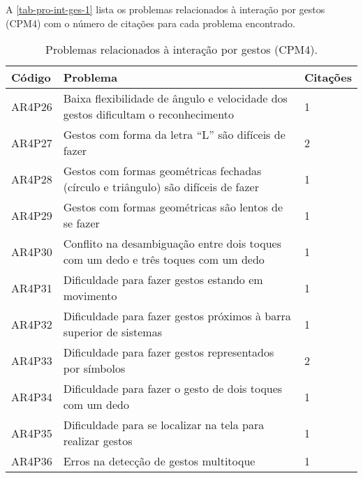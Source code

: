 A \autoref{tab-pro-int-ges-1} lista os problemas relacionados à interação por gestos (CPM4) com o número de citações para cada problema encontrado.

\begin{table}[htb]
  \begin{center}
    \ABNTEXfontereduzida
    \caption{Problemas relacionados à interação por gestos (CPM4).}
    \label{tab-pro-int-ges-1}
    \begin{tabular}{p{1.2cm}|p{12.0cm}|p{1.2cm}}
      \textbf{Código} & \textbf{Problema}                                                                  & \textbf{Citações} \\
      \hline
      AR4P26          & Baixa flexibilidade de ângulo e velocidade dos gestos dificultam o reconhecimento  & 1                 \\
      \hline
      AR4P27          & Gestos com forma da letra “L” são difíceis de fazer                                & 2                 \\
      \hline
      AR4P28          & Gestos com formas geométricas fechadas (círculo e triângulo) são difíceis de fazer & 1                 \\
      \hline
      AR4P29          & Gestos com formas geométricas são lentos de se fazer                               & 1                 \\
      \hline
      AR4P30          & Conflito na desambiguação entre dois toques com um dedo e três toques com um dedo  & 1                 \\
      \hline
      AR4P31          & Dificuldade para fazer gestos estando em movimento                                 & 1                 \\
      \hline
      AR4P32          & Dificuldade para fazer gestos próximos à barra superior de sistemas                & 1                 \\
      \hline
      AR4P33          & Dificuldade para fazer gestos representados por símbolos                           & 2                 \\
      \hline
      AR4P34          & Dificuldade para fazer o gesto de dois toques com um dedo                          & 1                 \\
      \hline
      AR4P35          & Dificuldade para se localizar na tela para realizar gestos                         & 1                 \\
      \hline
      AR4P36          & Erros na detecção de gestos multitoque                                             & 1                 \\

\end{tabular}
\end{center}
\end{table}
